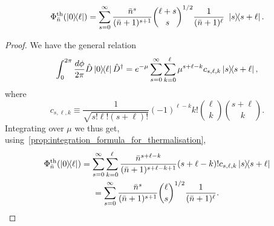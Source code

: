\documentclass[12pt]{report}
\begin{document}
\begin{prop}\label{prop:thermalisation_applied_to_0ell}
	\begin{equation}
		\Phi_{\bar n}^{\rm th}(\ketbra{0}{\ell}) =
		\sum_{s=0}^\infty
		\frac{\bar n^s}{(\bar n + 1)^{s+1}}
		\binom{\ell+s}{s}^{1/2}
		\frac{1}{(\bar n + 1)^\ell}
		\,\,\ketbra{s}{s+\ell}.
	\end{equation}
\end{prop}
\begin{proof}
	We have the general relation
	\begin{equation}
	\begin{gathered}
		\int_0^{2\pi} \frac{d\phi}{2\pi}
		\hat D \ketbra{0}{\ell} \hat D^\dagger =
		e^{-\mu} \sum_{s=0}^\infty
		\sum_{k=0}^\ell \mu^{s+\ell-k} c_{s,\ell,k}
		\ketbra{s}{s+\ell},
	\end{gathered}
	\end{equation}
	where
	\begin{equation}
		c_{s,\ell,k} \equiv
		\frac{1}{\sqrt{s!\ell!(s+\ell)!}} (-1)^{\ell-k}
		k! \binom{\ell}{k} \binom{s+\ell}{k}.
	\end{equation}
	Integrating over $\mu$ we thus get, using~\cref{prop:integration_formula_for_thermalisation},
	\begin{equation}
	\begin{gathered}
		\Phi_{\bar n}^{\rm th}(\ketbra{0}{\ell}) =
		\sum_{s=0}^\infty \sum_{k=0}^\ell
		\frac{\bar n^{s+\ell-k}}{(\bar n + 1)^{s+\ell-k+1}} (s+\ell-k)! c_{s,\ell,k} \ketbra{s}{s+\ell} \\
		= \sum_{s=0}^\infty
		\frac{\bar n^s}{(\bar n + 1)^{s+1}}
		\binom{\ell}{s}^{1/2}
		\frac{1}{(\bar n + 1)^\ell}.
	\end{gathered}
	\end{equation}
\end{proof}
\end{document}
